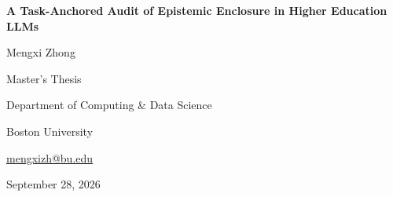 
\begin{titlepage}
  \centering
  \vspace*{1.5in}
  
  {\Large\bfseries A Task-Anchored Audit of Epistemic Enclosure in Higher Education LLMs\par}
  
  \vspace{1.5in}
  
  {\large Mengxi Zhong\par}
  
  \vspace{0.5in}
  
  {\normalsize Master's Thesis\par}
  {\normalsize Department of Computing \& Data Science\par}
  {\normalsize Boston University\par}
  {\normalsize \href{mailto:mengxizh@bu.edu}{mengxizh@bu.edu}\par}
  
  \vfill
  
  {\normalsize September 28, 2026\par}
\end{titlepage}

\thispagestyle{empty}
\newpage